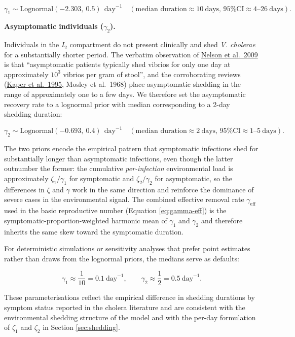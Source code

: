 \documentclass[
]{book}
\begin{document}
\[
\gamma_1 \sim \text{Lognormal}(-2.303,\ 0.5) \ \ \text{day}^{-1}
\quad (\text{median duration} \approx 10 \ \text{days, 95\% CI} \approx 4\text{--}26 \ \text{days}).
\]

\textbf{Asymptomatic individuals (\(\gamma_2\)).}

Individuals in the \(I_2\) compartment do not present clinically and shed \emph{V. cholerae} for a substantially shorter period. The verbatim observation of \href{https://www.ncbi.nlm.nih.gov/pmc/articles/PMC3842031/}{Nelson et al.~2009} is that ``asymptomatic patients typically shed vibrios for only one day at approximately \(10^3\) vibrios per gram of stool'', and the corroborating reviews (\href{https://doi.org/10.1128/cmr.8.1.48}{Kaper et al.~1995}, Mosley et al.~1968) place asymptomatic shedding in the range of approximately one to a few days. We therefore set the asymptomatic recovery rate to a lognormal prior with median corresponding to a 2-day shedding duration:

\[
\gamma_2 \sim \text{Lognormal}(-0.693,\ 0.4) \ \ \text{day}^{-1}
\quad (\text{median duration} \approx 2 \ \text{days, 95\% CI} \approx 1\text{--}5 \ \text{days}).
\]

The two priors encode the empirical pattern that symptomatic infections shed for substantially longer than asymptomatic infections, even though the latter outnumber the former: the cumulative \emph{per-infection} environmental load is approximately \(\zeta_1/\gamma_1\) for symptomatic and \(\zeta_2/\gamma_2\) for asymptomatic, so the differences in \(\zeta\) and \(\gamma\) work in the same direction and reinforce the dominance of severe cases in the environmental signal. The combined effective removal rate \(\gamma_{\mathrm{eff}}\) used in the basic reproductive number (Equation \eqref{eq:gamma-eff}) is the symptomatic-proportion-weighted harmonic mean of \(\gamma_1\) and \(\gamma_2\) and therefore inherits the same skew toward the symptomatic duration.

For deterministic simulations or sensitivity analyses that prefer point estimates rather than draws from the lognormal priors, the medians serve as defaults:

\[
\gamma_1 \approx \frac{1}{10} = 0.1 \ \text{day}^{-1}, \qquad
\gamma_2 \approx \frac{1}{2} = 0.5 \ \text{day}^{-1}.
\]

These parameterisations reflect the empirical difference in shedding durations by symptom status reported in the cholera literature and are consistent with the environmental shedding structure of the model and with the per-day formulation of \(\zeta_1\) and \(\zeta_2\) in Section \ref{sec:shedding}.
\end{document}
